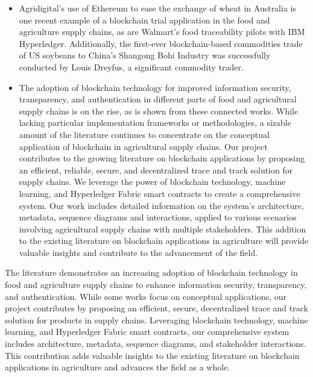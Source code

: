 \begin{itemize}
    \item Agridigital's use of Ethereum to ease the exchange of \cite{bib3}
    wheat in Australia is one recent example of a blockchain 
    trial application in the food and agriculture supply 
    chains, as are Walmart's food traceability pilots with 
    IBM Hyperledger. Additionally, the first-ever 
    blockchain-based commodities trade of US soybeans to 
    China's Shangong Bohi Industry was successfully 
    conducted by Louis Dreyfus, a significant commodity 
    trader.
    
    \item The adoption of blockchain technology for improved \cite{bib4}
    information security, transparency, and authentication in 
    different parts of food and agricultural supply chains is 
    on the rise, as is shown from these connected works. 
    While lacking particular implementation frameworks or 
    methodologies, a sizable amount of the literature 
    continues to concentrate on the conceptual application of 
    blockchain in agricultural supply chains. 
    Our project contributes to the growing literature on 
    blockchain applications by proposing an efficient, 
    reliable, secure, and decentralized trace and track solution 
    for supply chains. We leverage the power of 
    blockchain technology, machine learning, and 
    Hyperledger Fabric smart contracts to create a 
    comprehensive system. Our work includes detailed 
    information on the system's architecture, metadata, 
    sequence diagrams and interactions, applied to various 
    scenarios involving agricultural supply chains with 
    multiple stakeholders. This addition to the existing 
    literature on blockchain applications in agriculture will 
    provide valuable insights and contribute to the 
    advancement of the field.
  \end{itemize}


\noindent The literature demonstrates an increasing adoption of blockchain technology in food and agriculture supply chains to enhance information security, transparency, and authentication. While some works focus on conceptual applications, our project contributes by proposing an efficient, secure, decentralized trace and track solution for products in supply chains. Leveraging blockchain technology, machine learning, and Hyperledger Fabric smart contracts, our comprehensive system includes architecture, metadata, sequence diagrams, and stakeholder interactions. This contribution adds valuable insights to the existing literature on blockchain applications in agriculture and advances the field as a whole.